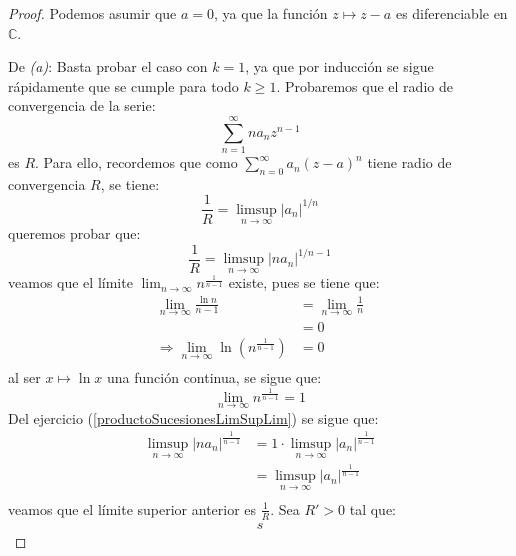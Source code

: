 \documentclass[12pt]{report}
\newcounter{it}
\theoremstyle{largebreak}
\newcommand\abs[1]{\ensuremath{\left|#1\right|}}
\begin{document}
    \begin{proof}
        Podemos asumir que $a=0$, ya que la función $z\mapsto z-a$ es diferenciable en $\mathbb{C}$.

        De \textit{(a)}: Basta probar el caso con $k=1$, ya que por inducción se sigue rápidamente que se cumple para todo $k\geq1$. Probaremos que el radio de convergencia de la serie:
        \begin{equation*}
            \sum_{ n=1}^\infty na_nz^{ n-1}
        \end{equation*}
        es $R$. Para ello, recordemos que como $\sum_{ n=0}^\infty a_n(z-a)^n$ tiene radio de convergencia $R$, se tiene:
        \begin{equation*}
            \frac{1}{R}=\limsup_{ n\rightarrow\infty}\abs{a_n}^{ 1/n}
        \end{equation*}
        queremos probar que:
        \begin{equation*}
            \frac{1}{R}=\limsup_{ n\rightarrow\infty}\abs{na_n}^{ 1/{n-1}}
        \end{equation*}
        veamos que el límite $\lim_{n\rightarrow\infty}n^{\frac{1}{n-1}}$ existe, pues se tiene que:
        \begin{equation*}
            \begin{split}
                \lim_{ n\rightarrow\infty}\frac{\ln n}{n-1}&=\lim_{ n\rightarrow\infty}\frac{1}{n}\\
                &=0\\
                \Rightarrow\lim_{ n\rightarrow\infty}\ln\left(n^{\frac{1}{n-1}} \right)&=0\\
            \end{split}
        \end{equation*}
        al ser $x\mapsto \ln x$ una función continua, se sigue que:
        \begin{equation*}
            \lim_{ n\rightarrow\infty}n^{\frac{1}{n-1}}=1
        \end{equation*}
        Del ejercicio (\ref{productoSucesionesLimSupLim}) se sigue que:
        \begin{equation*}
            \begin{split}
                \limsup_{ n\rightarrow\infty}\abs{na_n}^{\frac{1}{n-1}}&=1\cdot\limsup_{ n\rightarrow\infty}\abs{a_n}^{\frac{1}{n-1}}\\
                &=\limsup_{ n\rightarrow\infty}\abs{a_n}^{\frac{1}{n-1}}\\
            \end{split}
        \end{equation*}
        veamos que el límite superior anterior es $\frac{1}{R}$. Sea $R'>0$ tal que:
        \begin{equation*}
            \begin{split}
                s
            \end{split}
        \end{equation*}

    \end{proof}
\end{document}
